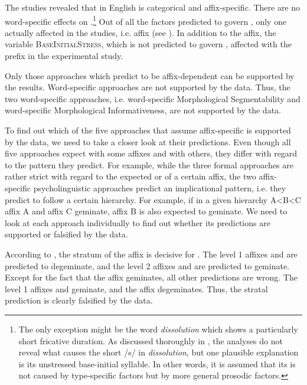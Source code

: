 The studies revealed that  in English is categorical and affix-specific. There are no word-specific effects on .\footnote{The only exception might be the word \textit{dissolution} which shows a particularly short fricative duration. As discussed thoroughly in , the analyses do not reveal what causes the short /s/ in \textit{dissolution}, but one plausible explanation is its unstressed base-initial syllable. In other words, it is assumed that its  is not caused by type-specific factors but by more general prosodic factors.} Out of all the factors predicted to govern , only one actually affected  in the studies, i.e. affix (see ). 
In addition to the affix, the variable \textsc{BaseInitialStress}, which is not predicted to govern ,  affected  with the prefix  in the experimental study. 

Only those approaches which predict  to be affix-dependent can be supported by the results. Word-specific approaches are not supported by the data.
Thus, the two word-specific approaches, i.e. word-specific Morphological Segmentability and word-specific Morphological Informativeness, are  not supported by the data. 

To find out which of the five approaches that assume affix-specific  is supported by the data, we need to take a closer look at their predictions. Even though all five approaches expect   with some affixes and  with others, they differ with regard to the  pattern they predict. For example, while the three formal approaches are rather strict with regard to the expected  or  of a  certain affix, the two affix-specific psycholinguistic approaches predict an implicational  pattern, i.e. they predict  to follow a certain hierarchy. For example, if in a given hierarchy A<B<C  affix A and affix C geminate, affix B is also expected to geminate. 
We need to look at each approach individually to find out whether its predictions are supported or falsified by the data. 

According to , the stratum of the affix is decisive for . The level 1 affixes  and  are predicted to degeminate, and the level 2 affixes  and  are predicted to geminate. Except for the fact that the  affix  geminates, all other predictions are wrong. The level 1 affixes  and  geminate, and the  affix  degeminates. Thus, the stratal prediction is clearly falsified by the data.

